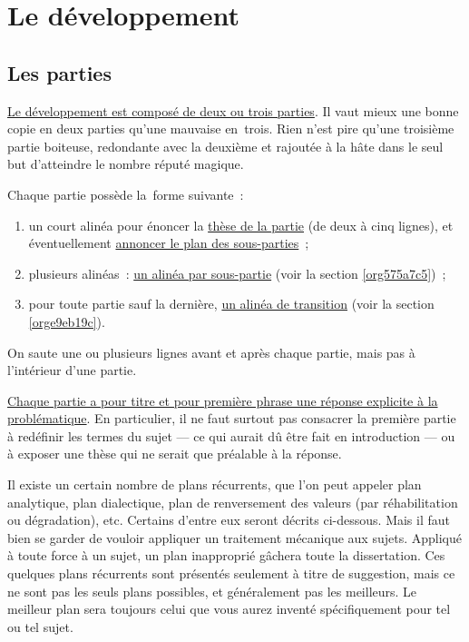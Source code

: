 \documentclass[a4paper,12pt]{report}
\begin{document}
\chapter{Le développement}
\label{sec:org8cac3e3}
\label{org43f0b4f}

\section{Les parties}
\label{sec:orgcf726ec}
\label{orgb4ac8d9}

\uline{Le développement est composé de deux ou trois parties}. Il vaut mieux
une bonne copie en deux parties qu'une mauvaise en trois. Rien n'est
pire qu'une troisième partie boiteuse, redondante avec la deuxième et
rajoutée à la hâte dans le seul but d'atteindre le nombre réputé
magique.

Chaque partie possède la forme suivante :

\begin{enumerate}
\item un court alinéa pour énoncer la \uline{thèse de la partie} (de deux à cinq
lignes), et éventuellement \uline{annoncer le plan des sous-parties} ;
\item plusieurs alinéas : \uline{un alinéa par sous-partie} (voir la section
\ref{org575a7c5}) ;
\item pour toute partie sauf la dernière, \uline{un alinéa de transition} (voir
la section \ref{orge9eb19c}).
\end{enumerate}

On saute une ou plusieurs lignes avant et après chaque partie, mais pas
à l'intérieur d'une partie.

\uline{Chaque partie a pour titre et pour première phrase une réponse
explicite à la problématique}. En particulier, il ne faut surtout pas
consacrer la première partie à redéfinir les termes du sujet --- ce qui
aurait dû être fait en introduction --- ou à exposer une thèse qui ne
serait que préalable à la réponse.

Il existe un certain nombre de plans récurrents, que l'on peut appeler
plan analytique, plan dialectique, plan de renversement des valeurs (par
réhabilitation ou dégradation), etc. Certains d'entre eux seront décrits
ci-dessous. Mais il faut bien se garder de vouloir appliquer un
traitement mécanique aux sujets. Appliqué à toute force à un sujet, un
plan inapproprié gâchera toute la dissertation. Ces quelques plans
récurrents sont présentés seulement à titre de suggestion, mais ce ne
sont pas les seuls plans possibles, et généralement pas les meilleurs.
Le meilleur plan sera toujours celui que vous aurez inventé
spécifiquement pour tel ou tel sujet.
\end{document}
